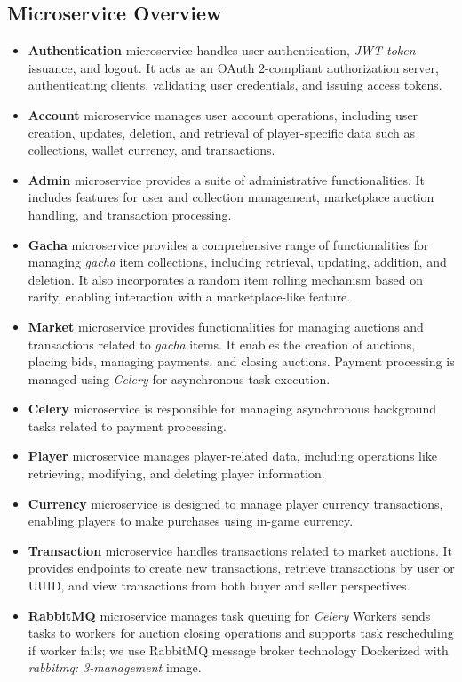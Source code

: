\documentclass{article}
\begin{document}
\subsection{Microservice Overview}
\begin{itemize}
    \item \textbf{Authentication} microservice handles user authentication, \emph{JWT token} issuance, and logout. It acts as an OAuth 2-compliant authorization server, authenticating clients, validating user credentials, and issuing access tokens.
    \item \textbf{Account} microservice manages user account operations, including user creation, updates, deletion, and retrieval of player-specific data such as collections, wallet currency, and transactions.
    \item \textbf{Admin} microservice provides a suite of administrative functionalities. It includes features for user and collection management, marketplace auction handling, and transaction processing.
    \item \textbf{Gacha} microservice provides a comprehensive range of functionalities for managing \emph{gacha} item collections, including retrieval, updating, addition, and deletion. It also incorporates a random item rolling mechanism based on rarity, enabling interaction with a marketplace-like feature.
    \item \textbf{Market} microservice provides functionalities for managing auctions and transactions related to \emph{gacha} items. It enables the creation of auctions, placing bids, managing payments, and closing auctions. Payment processing is managed using \emph{Celery} for asynchronous task execution.
    \item \textbf{Celery} microservice is responsible for managing asynchronous background tasks related to payment processing.
    \item \textbf{Player} microservice manages player-related data, including operations like retrieving, modifying, and deleting player information.
    \item \textbf{Currency} microservice is designed to manage player currency transactions, enabling players to make purchases using in-game currency.
    \item \textbf{Transaction} microservice handles transactions related to market auctions. It provides endpoints to create new transactions, retrieve transactions by user or UUID, and view transactions from both buyer and seller perspectives.
    \item \textbf{RabbitMQ} microservice manages task queuing for \emph{Celery} Workers sends tasks to workers for auction closing operations and supports task rescheduling if worker fails; we use RabbitMQ message broker technology Dockerized with \emph{rabbitmq: 3-management} image.
\end{itemize}
\end{document}
